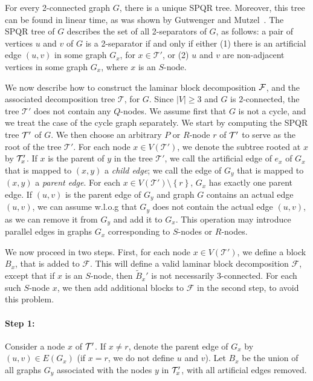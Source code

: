 \documentclass[twoside,leqno,twocolumn]{article}
\newcommand{\set}[1]{\left\{ #1 \right\}}
\newcommand{\tset}{{\mathcal T}}
\newcommand{\fset}{{\mathcal{F}}}
\begin{document}
For every 2-connected graph $G$, there is a unique SPQR tree. Moreover,
this tree can be found in linear time, as was shown by Gutwenger and Mutzel~\cite{SPQR-trees}.  
The SPQR tree of $G$ describes the set of all 2-separators of $G$, as follows: a pair of 
vertices $u$ and $v$ of $G$ is a 2-separator if and only if either (1) there is an artificial edge $(u,v)$ in some graph $G_x$, for $x\in \tset'$, or (2) $u$ and $v$ are non-adjacent vertices in some graph 
$G_x$, where $x$ is an $S$-node.


We now describe how to construct the laminar block decomposition $\cal F$, and the associated decomposition tree $\tset$, for $G$. Since $|V|\geq 3$ and $G$ is $2$-connected, the tree $\tset'$ does not contain any $Q$-nodes.
We assume first that $G$ is not a cycle, and we treat the case of the cycle graph 
separately. We start by computing the SPQR tree $\cal T'$ of $G$. We then choose an arbitrary 
$P$ or $R$-node $r$ of $\cal T'$ to serve as the root of the tree $\tset'$. For each node $x\in V(\tset')$, we denote the subtree rooted at
$x$ by ${\cal T}_x'$. If $x$ is the parent of $y$ in the tree $\tset'$, we call the artificial edge 
of $e_x$ of $G_x$ that is mapped to $(x,y)$ a \emph{child edge};
we call the edge of $G_y$ that is mapped to $(x,y)$ a \emph{parent edge}. For each $x\in V(\tset')\setminus\set{r}$, $G_x$  has exactly one parent edge. If $(u,v)$ is the parent edge of $G_y$ and graph $G$ contains an actual edge $(u,v)$, we can assume w.l.o.g that $G_y$ does not contain the actual edge $(u,v)$, as we can remove it from $G_y$ and add it to $G_x$. This operation may introduce parallel edges in graphs $G_x$ corresponding to $S$-nodes or $R$-nodes. 

We now proceed in two steps. First, for each node $x\in V(\tset')$, we define a block $B_x$, that is added to $\fset$. This will define a valid laminar block decomposition $\fset$, except that if $x$ is an $S$-node, then $\tilde{B}_x'$ is not necessarily $3$-connected. For each such $S$-node $x$, we then add additional blocks to $\fset$ in the second step, to avoid this problem.

\paragraph{Step 1:}
Consider a node $x$ of $\cal T'$. If $x\neq r$, denote the parent edge of $G_x$ by 
$(u,v)\in E(G_x)$ (if $x=r$, we do not define $u$ and $v$). Let $B_x$ be the union
of all graphs $G_y$ associated with the nodes $y$ in ${\cal T}_x'$, with all artificial 
edges removed. 
\end{document}
